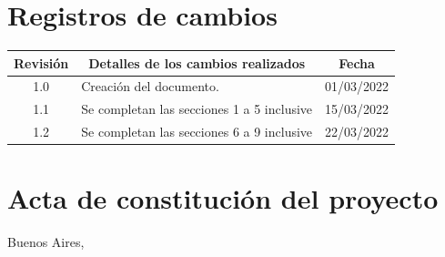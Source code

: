 \documentclass[
11pt, %
codirector, %
]{charter}
\begin{document}
\maketitle
\thispagestyle{empty}
\pagebreak


\thispagestyle{empty}
{\setlength{\parskip}{0pt}
\tableofcontents{}
}
\pagebreak


\section*{Registros de cambios}
\label{sec:registro}


\begin{table}[ht]
\label{tab:registro}
\centering
\begin{tabularx}{\linewidth}{@{}|c|X|c|@{}}
\hline
\rowcolor[HTML]{C0C0C0} 
Revisión & \multicolumn{1}{c|}{\cellcolor[HTML]{C0C0C0}Detalles de los cambios realizados} & Fecha      \\ \hline
1.0	& Creación del documento.						& 01/03/2022 \\ \hline
1.1	& Se completan las secciones 1 a 5 inclusive			& 15/03/2022 \\ \hline
1.2	& Se completan las secciones 6 a 9 inclusive                & 22/03/2022 \\ \hline
\end{tabularx}
\end{table}

\pagebreak



\section*{Acta de constitución del proyecto}
\label{sec:acta}

\begin{flushright}
Buenos Aires, \fechaInicioName
\end{flushright}

\vspace{2cm}
\end{document}
